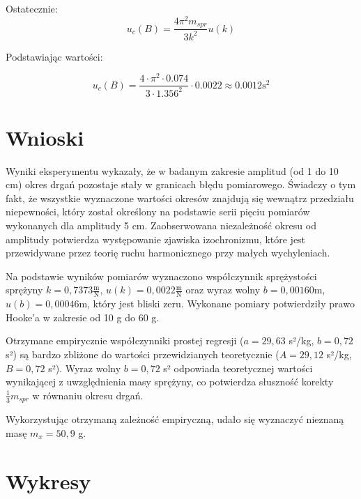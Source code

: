 \documentclass[a4paper,12pt]{article}
\begin{document}
Ostatecznie:
\begin{equation*}
    u_c(B) = \frac{4\pi^2m_{spr}}{3k^2} u(k)
\end{equation*}


Podstawiając wartości:

\begin{equation*}
    u_c(B) = \frac{4 \cdot \pi^2 \cdot 0.074}{3 \cdot 1.356^2} \cdot 0.0022 \approx 0.0012 \text{s}^2
\end{equation*}



\section{Wnioski}

Wyniki eksperymentu wykazały, że w badanym zakresie amplitud (od 1 do 10 cm) okres drgań pozostaje stały w granicach błędu pomiarowego. Świadczy o tym fakt, że wszystkie wyznaczone wartości okresów znajdują się wewnątrz przedziału niepewności, który został określony na podstawie serii pięciu pomiarów wykonanych dla amplitudy 5 cm. Zaobserwowana niezależność okresu od amplitudy potwierdza występowanie zjawiska izochronizmu, które jest przewidywane przez teorię ruchu harmonicznego przy małych wychyleniach.

Na podstawie wyników pomiarów wyznaczono współczynnik sprężystości sprężyny $k = 0{,}7373 \frac{\text{m}}{\text{N}}$, $u(k)= 0{,}0022 \frac{\text{m}}{\text{N}}$ oraz wyraz wolny $b = 0{,}00160 \text{m}$, $u(b)= 0{,}00046 \text{m}$, który jest bliski zeru. Wykonane pomiary potwierdziły prawo Hooke'a w zakresie od 10 g do 60 g.


Otrzymane empirycznie współczynniki prostej regresji ($a = 29,63$ s²/kg, $b = 0,72$ s²) są bardzo zbliżone do wartości przewidzianych teoretycznie ($A = 29,12$ s²/kg, $B = 0,72$ s²). Wyraz wolny $b = 0,72$ s² odpowiada teoretycznej wartości wynikającej z uwzględnienia masy sprężyny, co potwierdza słuszność korekty $\frac{1}{3}m_{spr}$ w równaniu okresu drgań.

Wykorzystując otrzymaną zależność empiryczną, udało się wyznaczyć nieznaną masę $m_x = 50,9$ g.

\section{Wykresy}
\end{document}
